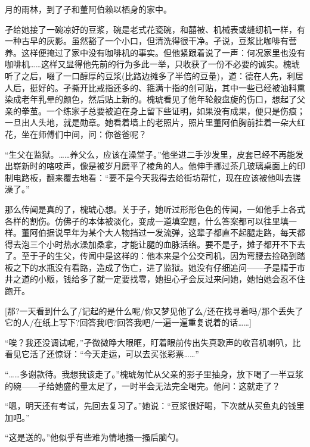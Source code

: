 \documentclass{article}
\begin{document}
\newpage 

月的雨林，到了孑和董阿伯赖以栖身的家中。

孑给她接了一碗凉好的豆浆，碗是老式花瓷碗，和囍被、机械表或缝纫机一样，有一种古早的灰影。虽然豁了一个小口，但清洗得很干净。孑说，豆浆比咖啡有营养。这样便掩过了家中没有咖啡机的事实。但他紧跟着说了一声：何况家里也没有咖啡机……这样又显得他先前的行为多此一举，只收获了一份不必要的诚实。槐琥听了之后，啜了一口醇厚的豆浆(比路边摊多了半倍的豆量)，道：德在人先，利居人后，挺好的。孑撕开比戒指还多的、箍满十指的创可贴，其中一些已经被油料熏染成老年乳晕的颜色，然后贴上新的。槐琥看见了他年轮般盘旋的伤口，想起了父亲的拳茧。一个练家子总要被迫在身上留下些证明，如果没有成果，便只是伤痕；一旦出人头地，就是勋章。她看着墙上的老照片，照片里董阿伯胸前挂着一朵大红花，坐在师傅们中间，问：你爸爸呢？

“生父在监狱。……养父么，应该在澡堂子。”他坐进二手沙发里，皮套已经不再能发出崭新时的咯吱声，像是被岁月磨平了棱角的人。他伸手挪过茶几玻璃桌面上的印制电路板，翻来覆去地看：“要不是今天我得去给街坊帮忙，现在应该被他叫去搓澡了。”

\newpage 



那么传闻是真的了，槐琥心想。关于孑，她听过形形色色的传闻，一如他手上各式各样的割伤。仿佛孑的本体被淡化，变成一道填空题，什么答案都可以往里填一样。董阿伯据说早年为某个大人物挡过一发流弹，这辈子都直不起腿走路，每天都得去泡三个小时热水澡加桑拿，才能让腿的血脉活络。要不是孑，摊子都开不下去了。至于孑的生父，传闻中是这样的：他本来是个公交司机，因为弯腰去捡硌到踏板之下的水瓶没有看路，造成了伤亡，进了监狱。她没有仔细追问——孑是精于市井之道的小贩，钱给多了就一定要找零，她担心孑会反过来问她，她怕她会忍不住跑开。

[那?一天看到什么了/记起的是什么呢/你又梦见他了么/还在找寻着吗/那个丢失了它的人/在纸上写下?回答我吧?回答我吧/一遍一遍重复说着的话……]

“唉？我还没调试呢，”孑微微睁大眼眶，盯着眼前传出失真歌声的收音机喇叭，比看见它活了还惊讶：“今天走运，可以去买张彩票……”

“……多谢款待。我想我该走了。”槐琥匆忙从父亲的影子里抽身，放下喝了一半豆浆的碗——孑给她盛的量太足了，一时半会无法完全喝完。他问：这就走了？

\newpage 



“嗯，明天还有考试，先回去复习了。”她说：“豆浆很好喝，下次就从买鱼丸的钱里加吧。”

“这是送的。”他似乎有些难为情地搔一搔后脑勺。
\end{document}
